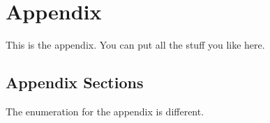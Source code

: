 \chapter{Appendix}\label{ch:appendix}
This is the appendix.
You can put all the stuff you like here.

\section{Appendix Sections}\label{sec:appendix-sections}
The enumeration for the appendix is different.